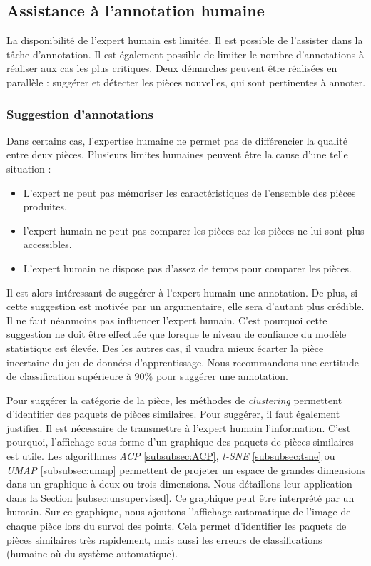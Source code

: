 \subsection{Assistance à l'annotation humaine}
La disponibilité de l'expert humain est limitée.
Il est possible de l'assister dans la tâche d'annotation.
Il est également possible de limiter le nombre d'annotations à réaliser aux cas les plus critiques.
Deux démarches peuvent être réalisées en parallèle : suggérer et détecter les pièces nouvelles, qui sont pertinentes à annoter.

\subsubsection{Suggestion d'annotations}
Dans certains cas, l'expertise humaine ne permet pas de différencier la qualité entre deux pièces.
Plusieurs limites humaines peuvent être la cause d'une telle situation :
\begin{itemize}
    \item L'expert ne peut pas mémoriser les caractéristiques de l'ensemble des pièces produites.
    \item l'expert humain ne peut pas comparer les pièces car les pièces ne lui sont plus accessibles.
    \item L'expert humain ne dispose pas d'assez de temps pour comparer les pièces.
\end{itemize}

Il est alors intéressant de suggérer à l'expert humain une annotation.
De plus, si cette suggestion est motivée par un argumentaire, elle sera d'autant plus crédible.
Il ne faut néanmoins pas influencer l'expert humain.
C'est pourquoi cette suggestion ne doit être effectuée que lorsque le niveau de confiance du modèle statistique est élevée.
Des les autres cas, il vaudra mieux écarter la pièce incertaine du jeu de données d'apprentissage.
Nous recommandons une certitude de classification supérieure à 90\% pour suggérer une annotation.

Pour suggérer la catégorie de la pièce, les méthodes de \textit{clustering} permettent d'identifier des paquets de pièces similaires.
Pour suggérer, il faut également justifier.
Il est nécessaire de transmettre à l'expert humain l'information.
C'est pourquoi, l'affichage sous forme d'un graphique des paquets de pièces similaires est utile.
Les algorithmes \textit{ACP} \ref{subsubsec:ACP}, \textit{t-SNE} \ref{subsubsec:tsne} ou \textit{UMAP} \ref{subsubsec:umap} permettent de projeter un espace de grandes dimensions dans un graphique à deux ou trois dimensions.
Nous détaillons leur application dans la Section \ref{subsec:unsupervised}.
Ce graphique peut être interprété par un humain.
Sur ce graphique, nous ajoutons l'affichage automatique de l'image de chaque pièce lors du survol des points.
Cela permet d'identifier les paquets de pièces similaires très rapidement, mais aussi les erreurs de classifications (humaine où du système automatique).


